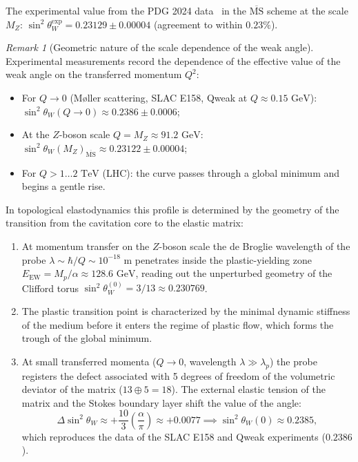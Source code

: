 \documentclass[11pt,a4paper]{article}
\theoremstyle{definition}
\theoremstyle{remark}
\newtheorem{remark}{Remark}
\begin{document}
The experimental value from the PDG 2024 data~\cite{PDG2024} in the $\overline{\mathrm{MS}}$ scheme at the scale $M_Z$: $\sin^2\theta_W^{\mathrm{exp}} = 0.23129 \pm 0.00004$ (agreement to within $0.23\%$).
	
\begin{remark}[Geometric nature of the scale dependence of the weak angle]
\label{rem:weinberg_running_geometry}
Experimental measurements record the dependence of the effective value of the weak angle on the transferred momentum $Q^2$:
\begin{itemize}
\item For $Q \to 0$ (Møller scattering, SLAC E158, Qweak at $Q \approx 0.15\text{ GeV}$): $\sin^2\theta_W(Q \to 0) \approx 0.2386 \pm 0.0006$;
\item At the $Z$-boson scale $Q = M_Z \approx 91.2\text{ GeV}$: $\sin^2\theta_W(M_Z)_{\overline{\mathrm{MS}}} \approx 0.23122 \pm 0.00004$;
\item For $Q > 1\dots 2\text{ TeV}$ (LHC): the curve passes through a global minimum and begins a gentle rise.
\end{itemize}
In topological elastodynamics this profile is determined by the geometry of the transition from the cavitation core to the elastic matrix:
\begin{enumerate}
\item At momentum transfer on the $Z$-boson scale the de Broglie wavelength of the probe $\lambda \sim \hbar/Q \sim 10^{-18}\text{ m}$ penetrates inside the plastic-yielding zone $E_{\mathrm{EW}} = M_p / \alpha \approx 128.6\text{ GeV}$, reading out the unperturbed geometry of the Clifford torus $\sin^2\theta_W^{(0)} = 3/13 \approx 0.230769$.
\item The plastic transition point is characterized by the minimal dynamic stiffness of the medium before it enters the regime of plastic flow, which forms the trough of the global minimum.
\item At small transferred momenta ($Q \to 0$, wavelength $\lambda \gg \lambda_p$) the probe registers the defect associated with 5 degrees of freedom of the volumetric deviator of the matrix ($13 \oplus 5 = 18$). The external elastic tension of the matrix and the Stokes boundary layer shift the value of the angle:
\begin{equation}
	\Delta\sin^2\theta_W \approx +\frac{10}{3} \left(\frac{\alpha}{\pi}\right) \approx +0.0077 \implies \sin^2\theta_W(0) \approx 0.2385,
\label{eq:weinberg_low_energy_shift}
\end{equation}
which reproduces the data of the SLAC E158 and Qweak experiments ($0.2386$).
\end{enumerate}
\end{remark}
	
\end{document}
